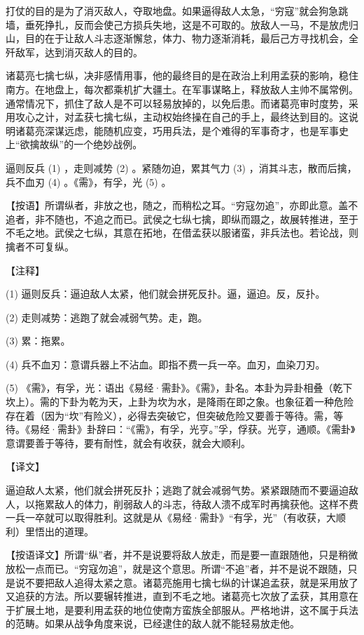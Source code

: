 \documentclass[12pt,UTF8]{ctexbook}
\begin{document}
打仗的目的是为了消灭敌人，夺取地盘。如果逼得敌人太急，“穷寇”就会狗急跳墙，垂死挣扎，反而会使己方损兵失地，这是不可取的。放敌人一马，不是放虎归山，目的在于让敌人斗志逐渐懈怠，体力、物力逐渐消耗，最后己方寻找机会，全歼敌军，达到消灭敌人的目的。

诸葛亮七擒七纵，决非感情用事，他的最终目的是在政治上利用孟获的影响，稳住南方。在地盘上，每次都乘机扩大疆土。在军事谋略上，释放敌人主帅不属常例。通常情况下，抓住了敌人是不可以轻易放掉的，以免后患。而诸葛亮审时度势，采用攻心之计，对孟获七擒七纵，主动权始终操在自己的手上，最终达到目的。这说明诸葛亮深谋远虑，能随机应变，巧用兵法，是个难得的军事奇才，也是军事史上“欲擒故纵”的一个绝妙战例。





逼则反兵 (1) ，走则减势 (2) 。紧随勿迫，累其气力 (3) ，消其斗志，散而后擒，兵不血刃 (4) 。《需》，有孚，光 (5) 。

【按语】所谓纵者，非放之也，随之，而稍松之耳。“穷寇勿追”，亦即此意。盖不追者，非不随也，不追之而已。武侯之七纵七擒，即纵而蹑之，故展转推进，至于不毛之地。武侯之七纵，其意在拓地，在借孟获以服诸蛮，非兵法也。若论战，则擒者不可复纵。





【注释】


(1) 逼则反兵：逼迫敌人太紧，他们就会拼死反扑。逼，逼迫。反，反扑。

(2) 走则减势：逃跑了就会减弱气势。走，跑。

(3) 累：拖累。

(4) 兵不血刃：意谓兵器上不沾血。即指不费一兵一卒。血刃，血染刀刃。

(5) 《需》，有孚，光：语出《易经·需卦》。《需》，卦名。本卦为异卦相叠（乾下坎上）。需的下卦为乾为天，上卦为坎为水，是降雨在即之象。也象征着一种危险存在着（因为“坎”有险义），必得去突破它，但突破危险又要善于等待。需，等待。《易经·需卦》卦辞曰：“《需》，有孚，光亨。”孚，俘获。光亨，通顺。《需卦》意谓要善于等待，要有耐性，就会有收获，就会大顺利。





【译文】


逼迫敌人太紧，他们就会拼死反扑；逃跑了就会减弱气势。紧紧跟随而不要逼迫敌人，以拖累敌人的体力，削弱敌人的斗志，待敌人溃不成军时再擒获他。这样不费一兵一卒就可以取得胜利。这就是从《易经·需卦》“有孚，光”（有收获，大顺利）里悟出的道理。

【按语译文】所谓“纵”者，并不是说要将敌人放走，而是要一直跟随他，只是稍微放松一点而已。“穷寇勿追”，就是这个意思。所谓“不追”者，并不是说不跟随，只是说不要把敌人追得太紧之意。诸葛亮施用七擒七纵的计谋追孟获，就是采用放了又追获的方法。所以要辗转推进，直到不毛之地。诸葛亮七次放了孟获，其用意在于扩展土地，是要利用孟获的地位使南方蛮族全部服从。严格地讲，这不属于兵法的范畴。如果从战争角度来说，已经逮住的敌人就不能轻易放走他。
\end{document}
